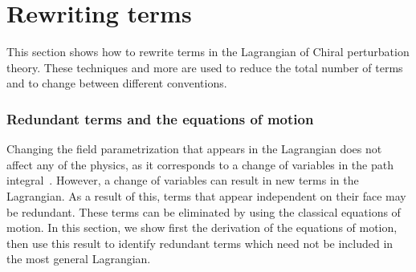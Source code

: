 \chapter{Rewriting terms}
\label{appendix:rewriting terms}

This section shows how to rewrite terms in the Lagrangian of Chiral perturbation theory.
These techniques and more are used to reduce the total number of terms and to change between different conventions.

\subsection*{Redundant terms and the equations of motion}

Changing the field parametrization that appears in the Lagrangian does not affect any of the physics, as it corresponds to a change of variables in the path integral~\cite{Scherer2002IntroductionTC,Chisholm:changeOfVar,Kamefuchi:changeOfVar}.
However, a change of variables can result in new terms in the Lagrangian.
As a result of this, terms that appear independent on their face may be redundant.
These terms can be eliminated by using the classical equations of motion.
In this section, we show first the derivation of the equations of motion, then use this result to identify redundant terms which need not be included in the most general Lagrangian.

